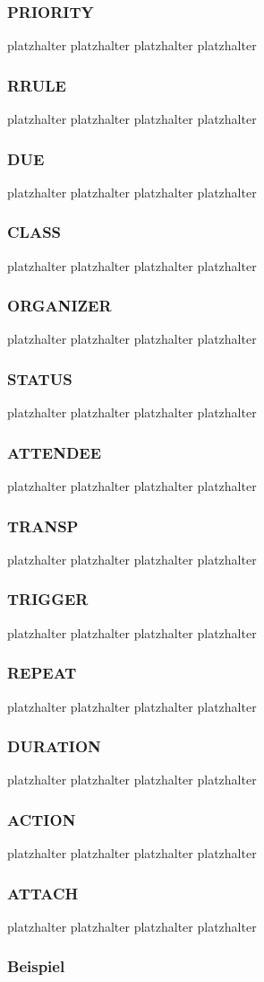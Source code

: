 \subsubsection{PRIORITY}
\label{sec:priority}
platzhalter platzhalter platzhalter platzhalter 
\subsubsection{RRULE}
\label{sec:rrule}
platzhalter platzhalter platzhalter platzhalter 
\subsubsection{DUE}
\label{sec:due}
platzhalter platzhalter platzhalter platzhalter 
\subsubsection{CLASS}
\label{sec:class}
platzhalter platzhalter platzhalter platzhalter 
\subsubsection{ORGANIZER}
\label{sec:organizer}
platzhalter platzhalter platzhalter platzhalter 
\subsubsection{STATUS}
\label{sec:status}
platzhalter platzhalter platzhalter platzhalter 
\subsubsection{ATTENDEE}
\label{sec:attendee}
platzhalter platzhalter platzhalter platzhalter 
\subsubsection{TRANSP}
\label{sec:transp}
platzhalter platzhalter platzhalter platzhalter 
\subsubsection{TRIGGER}
\label{sec:trigger}
platzhalter platzhalter platzhalter platzhalter 
\subsubsection{REPEAT}
\label{sec:repeat}
platzhalter platzhalter platzhalter platzhalter 
\subsubsection{DURATION}
\label{sec:duration}
platzhalter platzhalter platzhalter platzhalter 
\subsubsection{ACTION}
\label{sec:action}
platzhalter platzhalter platzhalter platzhalter 
\subsubsection{ATTACH}
\label{sec:attach}
platzhalter platzhalter platzhalter platzhalter 
\subsubsection{Beispiel}
\label{sec:beispiel_ical}

